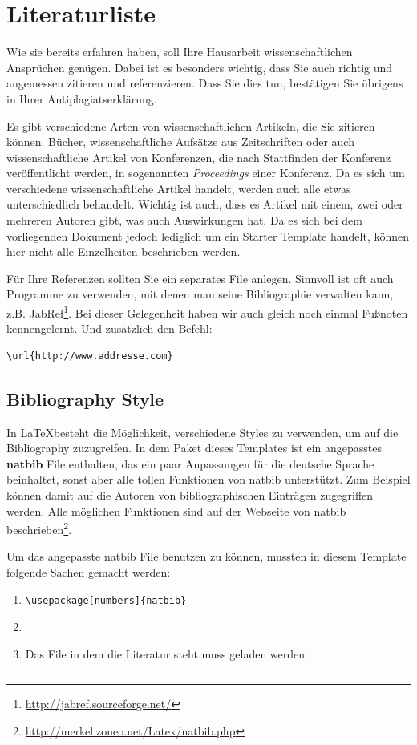 \documentclass[
     11pt,         %
     a4paper,      %
     oneside,
     ]{article}
\begin{document}
\section{Literaturliste}\label{sec:literatur}
Wie sie bereits erfahren haben, soll Ihre Hausarbeit wissenschaftlichen Ansprüchen genügen. Dabei ist es besonders wichtig, dass Sie auch richtig und angemessen zitieren und referenzieren. Dass Sie dies tun, bestätigen Sie übrigens in Ihrer Antiplagiatserklärung.

Es gibt verschiedene Arten von wissenschaftlichen Artikeln, die Sie zitieren können. Bücher, wissenschaftliche Aufsätze aus Zeitschriften oder auch wissenschaftliche Artikel von Konferenzen, die nach Stattfinden der Konferenz veröffentlicht werden, in sogenannten \emph{Proceedings} einer Konferenz. Da es sich um verschiedene wissenschaftliche Artikel handelt, werden auch alle etwas unterschiedlich behandelt. Wichtig ist auch, dass es Artikel mit einem, zwei oder mehreren Autoren gibt, was auch Auswirkungen hat. Da es sich bei dem vorliegenden Dokument jedoch lediglich um ein Starter Template handelt, können hier nicht alle Einzelheiten beschrieben werden.

Für Ihre Referenzen sollten Sie ein separates File anlegen. Sinnvoll ist oft auch Programme zu verwenden, mit denen man seine Bibliographie verwalten kann, z.B. JabRef\footnote{\url{http://jabref.sourceforge.net/}}. Bei dieser Gelegenheit haben wir auch gleich noch einmal Fußnoten kennengelernt. Und zusätzlich den Befehl:
\begin{verbatim}\url{http://www.addresse.com}\end{verbatim}

\subsection{Bibliography Style}
In \LaTeX besteht die Möglichkeit, verschiedene Styles zu verwenden, um auf die Bibliography zuzugreifen. In dem Paket dieses Templates ist ein angepasstes \textbf{natbib}  File enthalten, das ein paar Anpassungen für die deutsche Sprache beinhaltet, sonst aber alle tollen Funktionen von natbib unterstützt. Zum Beispiel können damit auf die Autoren von bibliographischen Einträgen zugegriffen werden. Alle möglichen Funktionen sind auf der Webseite von natbib beschrieben\footnote{\url{http://merkel.zoneo.net/Latex/natbib.php}}.

Um das angepasste natbib File benutzen zu können, mussten in diesem Template folgende Sachen gemacht werden:
\begin{enumerate}
\item \begin{verbatim}\usepackage[numbers]{natbib}\end{verbatim}
\item \begin{verbatim}\end{verbatim} 
\item Das File in dem die Literatur steht muss geladen werden: \begin{verbatim}\end{verbatim}
\end{enumerate}
\end{document}
